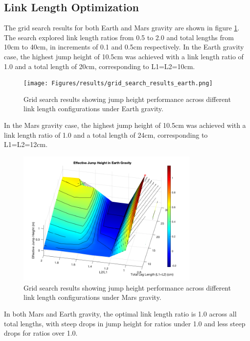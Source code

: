 \subsection{Link Length Optimization}
The grid search results for both Earth and Mars gravity are shown in figure \ref{fig:results:grid_search_results}. The search explored link length ratios from 0.5 to 2.0 and total lengths from 10cm to 40cm, in increments of 0.1 and 0.5cm respectively.
In the Earth gravity case, the highest jump height of 10.5cm was achieved with a link length ratio of 1.0 and a total length of 20cm, corresponding to L1=L2=10cm.  

\begin{figure}[h]
    \centering
    \texttt{[image: Figures/results/grid\_search\_results\_earth.png]}
    \caption{Grid search results showing jump height performance across different link length configurations under Earth gravity.}
    \label{fig:results:grid_search_results}
\end{figure}

In the Mars gravity case, the highest jump height of 10.5cm was achieved with a link length ratio of 1.0 and a total length of 24cm, corresponding to L1=L2=12cm.
\begin{figure}[h]
    \centering
    \includegraphics[width=0.8\textwidth]{Images/results/grid_search_results.png}
    \caption{Grid search results showing jump height performance across different link length configurations under Mars gravity.}
    \label{fig:results:grid_search_mars}
\end{figure}

In both Mars and Earth gravity, the optimal link length ratio is 1.0 across all total lengths, with steep drops in jump height for ratios under 1.0 and less steep drops for ratios over 1.0.

